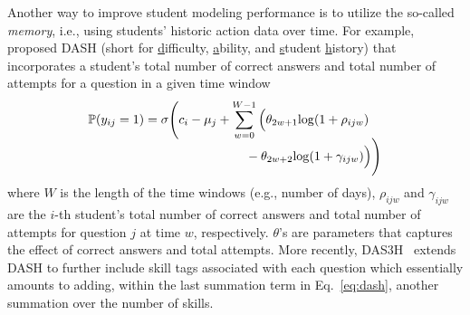 \documentclass{edm_article}
\begin{document}
Another way to improve student modeling performance is to utilize the so-called \textit{memory}, i.e., using students' historic action data over time. For example, ~\cite{lindsey2014improving,mozer2016predicting} proposed DASH (short for \underline{d}ifficulty, \underline{a}bility, and \underline{s}tudent \underline{h}istory) that incorporates a student's total number of correct answers and total number of attempts for a question in a given time window
\begin{align}
    \begin{split}
        \mathbb{P}(y_{ij}=1) &= \sigma\Bigg( c_i - \mu_j + \sum_{w=0}^{W-1} \Big(\theta_{2w+1}{\rm log}(1+\rho_{ijw}) \\[-5pt]
        &\qquad\qquad\qquad\qquad- \theta_{2w+2}{\rm log}(1+\gamma_{ijw})\Big) \Bigg)
    \end{split}\label{eq:dash}
\end{align}
where $W$ is the length of the time windows (e.g., number of days), $\rho_{ijw}$ and $\gamma_{ijw}$ are the $i$-th student's total number of correct answers and total number of attempts for question $j$ at time $w$, respectively. $\theta$'s are parameters that captures the effect of correct answers and total attempts. More recently, DAS3H~\cite{das3h} extends DASH to further include skill tags associated with each question which essentially amounts to adding, within the last summation term in Eq.~\ref{eq:dash}, another summation over the number of skills.
\end{document}
